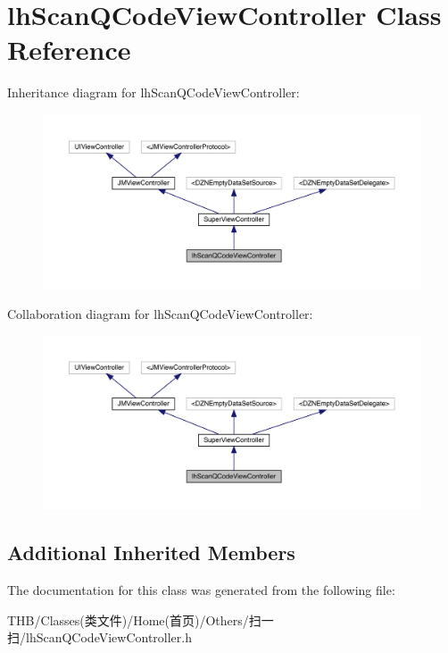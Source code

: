 \hypertarget{interfacelh_scan_q_code_view_controller}{}\section{lh\+Scan\+Q\+Code\+View\+Controller Class Reference}
\label{interfacelh_scan_q_code_view_controller}


Inheritance diagram for lh\+Scan\+Q\+Code\+View\+Controller\+:\nopagebreak
\begin{figure}[H]
\begin{center}
\leavevmode
\includegraphics[width=350pt]{interfacelh_scan_q_code_view_controller__inherit__graph}
\end{center}
\end{figure}


Collaboration diagram for lh\+Scan\+Q\+Code\+View\+Controller\+:\nopagebreak
\begin{figure}[H]
\begin{center}
\leavevmode
\includegraphics[width=350pt]{interfacelh_scan_q_code_view_controller__coll__graph}
\end{center}
\end{figure}
\subsection*{Additional Inherited Members}


The documentation for this class was generated from the following file\+:\begin{DoxyCompactItemize}
\item 
T\+H\+B/\+Classes(类文件)/\+Home(首页)/\+Others/扫一扫/lh\+Scan\+Q\+Code\+View\+Controller.\+h\end{DoxyCompactItemize}

